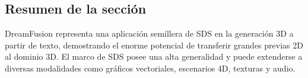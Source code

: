 \subsection{Resumen de la sección}

DreamFusion representa una aplicación semillera de SDS en la generación 3D a partir de texto, demostrando el enorme potencial de transferir grandes previas 2D al dominio 3D. El marco de SDS posee una alta generalidad y puede extenderse a diversas modalidades como gráficos vectoriales, escenarios 4D, texturas y audio.

\newpage
